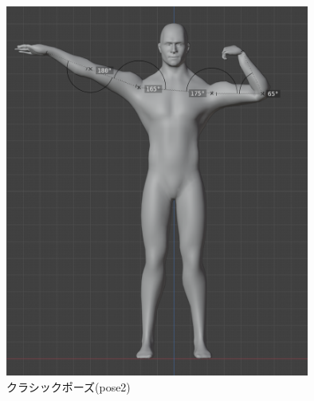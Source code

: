 \begin{figure}[htbp]
  \begin{center}
      \includegraphics[width=10cm]{figures/pose2.png}
      \caption{クラシックポーズ(pose2)}
      \label{fig:pose2}
  \end{center}
\end{figure}
